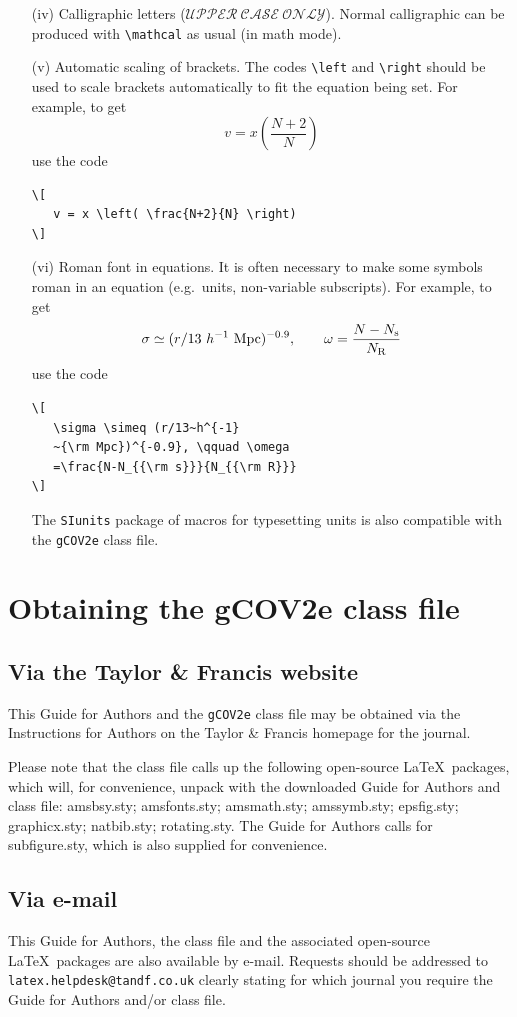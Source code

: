 \documentclass{gCOV2e}
\theoremstyle{plain}%
\theoremstyle{definition}
\theoremstyle{remark}
\begin{document}
\begin{enumerate}
\item[(iv)] Calligraphic letters ($\mathcal{UPPER\ CASE\ ONLY}$).
Normal calligraphic can be produced with \verb"\mathcal" as usual (in math mode).

\item[(v)] Automatic scaling of brackets. The codes \verb"\left" and
\verb"\right" should  be used to scale brackets automatically to
fit the equation being set. For example, to get
\[
   v = x \left( \frac{N+2}{N} \right)
\]
use the code
\begin{verbatim}
\[
   v = x \left( \frac{N+2}{N} \right)
\]
\end{verbatim}

\item[(vi)] Roman font in equations. It is often necessary to make some
symbols roman in an equation (e.g.\ units, non-variable subscripts).
For example, to get
\[
   \sigma \simeq (r/13~h^{-1}~{\rm Mpc})^{-0.9},
   \qquad \omega = \frac{N-N_{\rm s}}{N_{\rm R}}
\]
\noindent use the code
\begin{verbatim}
\[
   \sigma \simeq (r/13~h^{-1}
   ~{\rm Mpc})^{-0.9}, \qquad \omega
   =\frac{N-N_{{\rm s}}}{N_{{\rm R}}}
\]
\end{verbatim}
The \texttt{SIunits} package of macros for typesetting units is also compatible with the \texttt{gCOV2e} class file.
\end{enumerate}


\section{Obtaining the gCOV2e class file}\label{FTP}

\subsection{Via the Taylor \& Francis website}

This Guide for Authors and the \texttt{gCOV2e} class file may be obtained via the Instructions for Authors
on the Taylor \& Francis homepage for the journal.

Please note that the class file calls up the following open-source \LaTeX\ packages, which will, for convenience,
unpack with the downloaded Guide for Authors and class file: amsbsy.sty; amsfonts.sty; amsmath.sty; amssymb.sty; epsfig.sty; graphicx.sty; natbib.sty; rotating.sty.
The Guide for Authors calls for subfigure.sty, which is also supplied for convenience.


\subsection{Via e-mail}

This Guide for Authors, the class file and the associated open-source \LaTeX\ packages are also available by e-mail.
Requests should be addressed to \texttt{latex.helpdesk@tandf.co.uk} clearly stating for which journal you require the Guide for Authors and/or class file.
\end{document}
